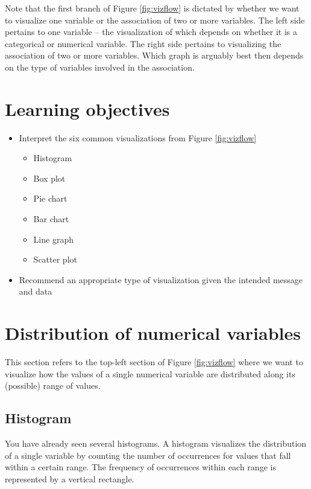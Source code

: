 \documentclass[
]{book}
\providecommand{\tightlist}{%
  \setlength{\itemsep}{0pt}\setlength{\parskip}{0pt}}
\begin{document}
Note that the first branch of Figure \ref{fig:vizflow} is dictated by whether we want to visualize one variable or the association of two or more variables. The left side pertains to one variable -- the visualization of which depends on whether it is a categorical or numerical variable. The right side pertains to visualizing the association of two or more variables. Which graph is arguably best then depends on the type of variables involved in the association.

\hypertarget{lo5}{%
\section{Learning objectives}\label{lo5}}

\begin{itemize}
\tightlist
\item
  Interpret the six common visualizations from Figure \ref{fig:vizflow}

  \begin{itemize}
  \tightlist
  \item
    Histogram
  \item
    Box plot
  \item
    Pie chart
  \item
    Bar chart
  \item
    Line graph
  \item
    Scatter plot
  \end{itemize}
\item
  Recommend an appropriate type of visualization given the intended message and data
\end{itemize}

\hypertarget{distribution-of-numerical-variables}{%
\section{Distribution of numerical variables}\label{distribution-of-numerical-variables}}

This section refers to the top-left section of Figure \ref{fig:vizflow} where we want to visualize how the values of a single numerical variable are distributed along its (possible) range of values.

\hypertarget{histogram}{%
\subsection{Histogram}\label{histogram}}

You have already seen several histograms. A histogram visualizes the distribution of a single variable by counting the number of occurrences for values that fall within a certain range. The frequency of occurrences within each range is represented by a vertical rectangle.
\end{document}
